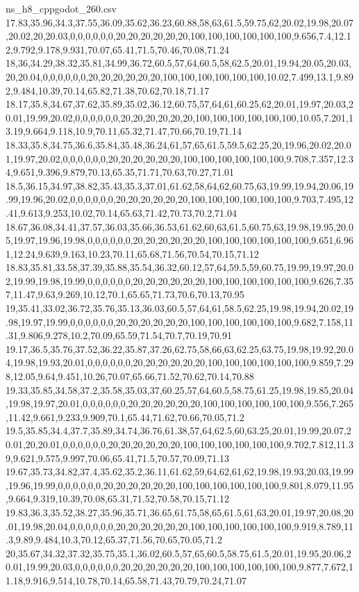 \begin{filecontents*}[overwrite]{ns_h8_cppgodot_260.csv}
17.83,35.96,34.3,37.55,36.09,35.62,36.23,60.88,58,63,61.5,59.75,62,20.02,19.98,20.07,20.02,20,20.03,0,0,0,0,0,0,20,20,20,20,20,20,100,100,100,100,100,100,9.656,7.4,12.12,9.792,9.178,9.931,70.07,65.41,71.5,70.46,70.08,71.24
18,36,34.29,38.32,35.81,34.99,36.72,60.5,57,64,60.5,58,62.5,20.01,19.94,20.05,20.03,20,20.04,0,0,0,0,0,0,20,20,20,20,20,20,100,100,100,100,100,100,10.02,7.499,13.1,9.892,9.484,10.39,70.14,65.82,71.38,70.62,70.18,71.17
18.17,35.8,34.67,37.62,35.89,35.02,36.12,60.75,57,64,61,60.25,62,20.01,19.97,20.03,20.01,19.99,20.02,0,0,0,0,0,0,20,20,20,20,20,20,100,100,100,100,100,100,10.05,7.201,13.19,9.664,9.118,10.9,70.11,65.32,71.47,70.66,70.19,71.14
18.33,35.8,34.75,36.6,35.84,35.48,36.24,61,57,65,61.5,59.5,62.25,20,19.96,20.02,20.01,19.97,20.02,0,0,0,0,0,0,20,20,20,20,20,20,100,100,100,100,100,100,9.708,7.357,12.34,9.651,9.396,9.879,70.13,65.35,71.71,70.63,70.27,71.01
18.5,36.15,34.97,38.82,35.43,35.3,37.01,61.62,58,64,62,60.75,63,19.99,19.94,20.06,19.99,19.96,20.02,0,0,0,0,0,0,20,20,20,20,20,20,100,100,100,100,100,100,9.703,7.495,12.41,9.613,9.253,10.02,70.14,65.63,71.42,70.73,70.2,71.04
18.67,36.08,34.41,37.57,36.03,35.66,36.53,61.62,60,63,61.5,60.75,63,19.98,19.95,20.05,19.97,19.96,19.98,0,0,0,0,0,0,20,20,20,20,20,20,100,100,100,100,100,100,9.651,6.961,12.24,9.639,9.163,10.23,70.11,65.68,71.56,70.54,70.15,71.12
18.83,35.81,33.58,37.39,35.88,35.54,36.32,60.12,57,64,59.5,59,60.75,19.99,19.97,20.02,19.99,19.98,19.99,0,0,0,0,0,0,20,20,20,20,20,20,100,100,100,100,100,100,9.626,7.357,11.47,9.63,9.269,10.12,70.1,65.65,71.73,70.6,70.13,70.95
19,35.41,33.02,36.72,35.76,35.13,36.03,60.5,57,64,61,58.5,62.25,19.98,19.94,20.02,19.98,19.97,19.99,0,0,0,0,0,0,20,20,20,20,20,20,100,100,100,100,100,100,9.682,7.158,11.31,9.806,9.278,10.2,70.09,65.59,71.54,70.7,70.19,70.91
19.17,36.5,35.76,37.52,36.22,35.87,37.26,62.75,58,66,63,62.25,63.75,19.98,19.92,20.04,19.98,19.93,20.01,0,0,0,0,0,0,20,20,20,20,20,20,100,100,100,100,100,100,9.859,7.298,12.05,9.64,9.451,10.26,70.07,65.66,71.52,70.62,70.14,70.88
19.33,35.85,34.58,37.2,35.58,35.03,37,60.25,57,64,60.5,58.75,61.25,19.98,19.85,20.04,19.98,19.97,20.01,0,0,0,0,0,0,20,20,20,20,20,20,100,100,100,100,100,100,9.556,7.265,11.42,9.661,9.233,9.909,70.1,65.44,71.62,70.66,70.05,71.2
19.5,35.85,34.4,37.7,35.89,34.74,36.76,61.38,57,64,62.5,60,63.25,20.01,19.99,20.07,20.01,20,20.01,0,0,0,0,0,0,20,20,20,20,20,20,100,100,100,100,100,100,9.702,7.812,11.39,9.621,9.575,9.997,70.06,65.41,71.5,70.57,70.09,71.13
19.67,35.73,34.82,37.4,35.62,35.2,36.11,61.62,59,64,62,61,62,19.98,19.93,20.03,19.99,19.96,19.99,0,0,0,0,0,0,20,20,20,20,20,20,100,100,100,100,100,100,9.801,8.079,11.95,9.664,9.319,10.39,70.08,65.31,71.52,70.58,70.15,71.12
19.83,36.3,35.52,38.27,35.96,35.71,36.65,61.75,58,65,61.5,61,63,20.01,19.97,20.08,20.01,19.98,20.04,0,0,0,0,0,0,20,20,20,20,20,20,100,100,100,100,100,100,9.919,8.789,11.3,9.89,9.484,10.3,70.12,65.37,71.56,70.65,70.05,71.2
20,35.67,34.32,37.32,35.75,35.1,36.02,60.5,57,65,60.5,58.75,61.5,20.01,19.95,20.06,20.01,19.99,20.03,0,0,0,0,0,0,20,20,20,20,20,20,100,100,100,100,100,100,9.877,7.672,11.18,9.916,9.514,10.78,70.14,65.58,71.43,70.79,70.24,71.07
\end{filecontents*}

